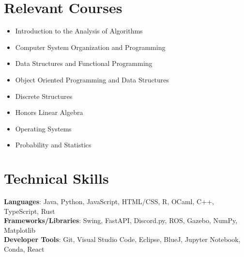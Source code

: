\documentclass[letterpaper,11pt]{article}
\begin{document}
\section{Relevant Courses}
\begin{multicols}{2}\small
  \begin{itemize}[noitemsep,topsep=0pt,parsep=0pt,partopsep=0pt]
    \item Introduction to the Analysis of Algorithms
    \item Computer System Organization and Programming
    \item Data Structures and Functional Programming
    \item Object Oriented Programming and Data Structures
    \item Discrete Structures
    \item Honors Linear Algebra
    \item Operating Systems
    \item Probability and Statistics
  \end{itemize}\normalsize
\end{multicols}




%
\section{Technical Skills}
\begin{itemize}[leftmargin=0.15in, label={}]
  \small{\item{
                \textbf{Languages}{: Java, Python, JavaScript, HTML/CSS, R, OCaml, C++, TypeScript, Rust} \\
                \textbf{Frameworks/Libraries}{: Swing, FastAPI, Discord.py, ROS, Gazebo, NumPy, Matplotlib} \\
                \textbf{Developer Tools}{: Git, Visual Studio Code, Eclipse, BlueJ, Jupyter Notebook, Conda, React}
          }}
\end{itemize}


\end{document}
